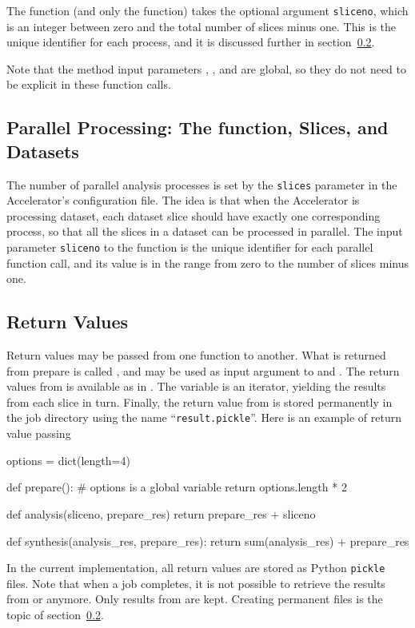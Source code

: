 The \analysis function (and only the \analysis function) takes the
optional argument \texttt{sliceno}, which is an integer between zero
and the total number of slices minus one.  This is the unique
identifier for each \analysis process, and it is discussed further in
section~\ref{}.

Note that the method input parameters \options, \jobids, and \datasets
are global, so they do not need to be explicit in these function
calls.


\subsection{Parallel Processing:  The \analysis function, Slices, and Datasets}
The number of parallel analysis processes is set by the
\texttt{slices} parameter in the Accelerator's configuration file.
The idea is that when the Accelerator is processing dataset, each
dataset slice should have exactly one corresponding \analysis process,
so that all the slices in a dataset can be processed in parallel.  The
input parameter \texttt{sliceno} to the \analysis function is the
unique identifier for each parallel function call, and its value is in
the range from zero to the number of slices minus one.


\subsection{Return Values}
Return values may be passed from one function to another.  What is
returned from prepare is called \prepareres, and may be used as input
argument to \analysis and \synthesis.  The return values from
\analysis is available as \analysisres in \synthesis.  The
\analysisres variable is an iterator, yielding the results from each
slice in turn.  Finally, the return value from \synthesis is stored
permanently in the job directory using the name
``\texttt{result.pickle}''.  Here is an example of return value
passing
\begin{python}
options = dict(length=4)

def prepare():
    # options is a global variable
    return options.length * 2

def analysis(sliceno, prepare_res)
    return prepare_res + sliceno

def synthesis(analysis_res, prepare_res):
     return sum(analysis_res) + prepare_res
\end{python}
In the current implementation, all return values are stored as Python
\texttt{pickle} files.  Note that when a job completes, it is not
possible to retrieve the results from \prepare or \analysis anymore.
Only results from \synthesis are kept.  Creating permanent files is
the topic of section~\ref{}.


